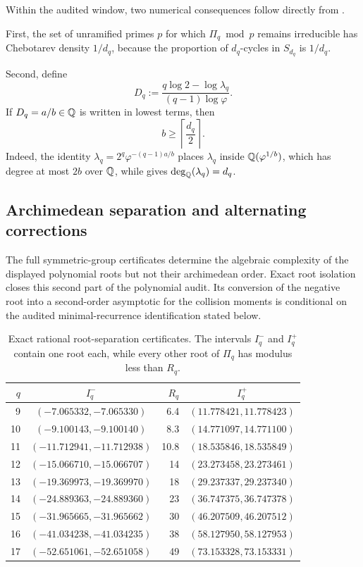 \begin{remark}
\label{rem:galois-window-consequences}
Within the audited window, two numerical consequences follow directly from
.

First, the set of unramified primes \(p\) for which \(\Pi_q\bmod p\) remains
irreducible has Chebotarev density \(1/d_q\), because the proportion of
\(d_q\)-cycles in \(S_{d_q}\) is \(1/d_q\).

Second, define
\[
  D_q:=\frac{q\log 2-\log \lambda_q}{(q-1)\log\varphi}.
\]
If \(D_q=a/b\in\mathbb{Q}\) is written in lowest terms, then
\[
  b\ge \left\lceil\frac{d_q}{2}\right\rceil.
\]
Indeed, the identity \(\lambda_q=2^q\varphi^{-(q-1)a/b}\) places \(\lambda_q\)
inside \(\mathbb{Q}(\varphi^{1/b})\), which has degree at most \(2b\) over \(\mathbb{Q}\),
while  gives \(\deg_{\mathbb{Q}}(\lambda_q)=d_q\).
\end{remark}

\subsection{Archimedean separation and alternating corrections}

The full symmetric-group certificates determine the algebraic complexity of
the displayed polynomial roots but not their archimedean order.  Exact root
isolation closes this second part of the polynomial audit.  Its conversion of
the negative root into a second-order asymptotic for the collision moments is
conditional on the audited minimal-recurrence identification stated below.

\begin{table}[t]
\centering
\scriptsize
\setlength{\tabcolsep}{5pt}
\caption{Exact rational root-separation certificates.  The intervals
\(I_q^-\) and \(I_q^+\) contain one root each, while every other root of
\(\Pi_q\) has modulus less than \(R_q\).}
\label{tab:secondary-root-isolation-q9-17}
\begin{tabular}{r c r c}
\toprule
\(q\) & \(I_q^-\) & \(R_q\) & \(I_q^+\) \\
\midrule
9  & \((-7.065332,-7.065330)\)   & 6.4  & \((11.778421,11.778423)\) \\
10 & \((-9.100143,-9.100140)\)   & 8.3  & \((14.771097,14.771100)\) \\
11 & \((-11.712941,-11.712938)\) & 10.8 & \((18.535846,18.535849)\) \\
12 & \((-15.066710,-15.066707)\) & 14   & \((23.273458,23.273461)\) \\
13 & \((-19.369973,-19.369970)\) & 18   & \((29.237337,29.237340)\) \\
14 & \((-24.889363,-24.889360)\) & 23   & \((36.747375,36.747378)\) \\
15 & \((-31.965665,-31.965662)\) & 30   & \((46.207509,46.207512)\) \\
16 & \((-41.034238,-41.034235)\) & 38   & \((58.127950,58.127953)\) \\
17 & \((-52.651061,-52.651058)\) & 49   & \((73.153328,73.153331)\) \\
\bottomrule
\end{tabular}
\end{table}

